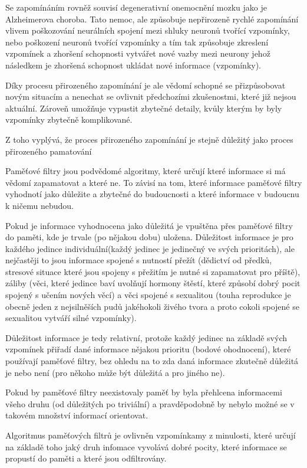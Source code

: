 Se zapomínáním rovněž souvisí degenerativní onemocnění mozku jako je Alzheimerova choroba. Tato nemoc, ale způsobuje nepřirozeně rychlé zapomínání vlivem poškozování neurálních spojení mezi shluky neuronů tvořící vzpomínky, nebo poškození neuronů tvořící vzpomínky a tím tak způsobuje zkreslení vzpomínek a zhoršení schopnosti vytvářet nové vazby mezi neurony jehož následkem je zhoršená schopnost ukládat nové informace (vzpomínky).

Díky procesu přirozeného zapomínání je ale vědomí schopné se přizpůsobovat novým situacím a nenechat se ovlivnit předchozími zkušenostmi, které již nejsou aktuální. Zároveň umožňuje vypustit zbytečné detaily, kvůly kterým by byly vzpomínky zbytečně komplikované. 

Z toho vyplývá, že proces přirozeného zapomínání je stejně důležitý jako proces přirozeného pamatování


Paměťové filtry jsou podvědomé algoritmy, které určují které informace si má vědomí zapamatovat a které ne. To závisí na tom, které informace paměťové filtry vyhodnotí jako důležite a zbytečné do budoucnosti a které informace v budoucnu k ničemu nebudou.

Pokud je informace vyhodnocena jako důležitá je vpuštěna přes paměťové filtry do paměti, kde je trvale (po nějakou dobu) uložena. Důležitost informace je pro každého jedince individuální(každý jedinec je jedinečný ve svých prioritách), ale nejčastěji to jsou informace spojené s nutností přežít (dědictví od předků, stresové situace které jsou spojeny s přežitím je nutné si zapamatovat pro příště), záliby (věci, které jedince baví uvolňují hormony štěstí, které způsobí dobrý pocit spojený s učením nových věcí) a věci spojené s sexualitou (touha reprodukce je obecně jeden z nejsilněších pudů jakéhokoli živého tvora a proto cokoli spojené se sexualitou vytváří silné vzpomínky).

Důležitost informace je tedy relativní, protože každý jedinec na základě svých vzpomínek přiřadí dané informace nějakou prioritu (bodové ohodnocení), které používají paměťové filtry, bez  ohledu na to zda daná informace zkutečně důležitá je nebo není (pro někoho může být důležitá a pro jiného ne).

Pokud by paměťové filtry neexistovaly paměť by byla přehlcena informacemi všeho druhu (od důležitých po triviální) a pravděpodobně by nebylo možné se v takovém množství informací orientovat.

Algoritmus paměťových filtrů je ovlivněn vzpomínkamy z minulosti, které určují na základě toho jaký druh infomace vyvolává dobré pocity, které informace se propustí do paměti a které jsou odfiltrovány.

